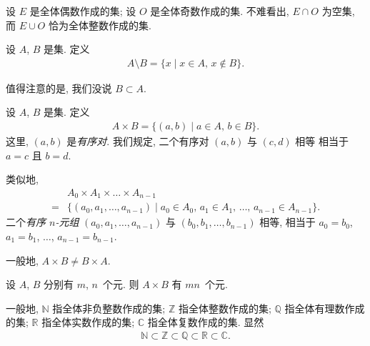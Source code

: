 \begin{example}
    设 $E$ 是全体偶数作成的集;
    设 $O$ 是全体奇数作成的集.
    不难看出, $E \cap O$ 为空集,
    而 $E \cup O$ 恰为全体整数作成的集.
\end{example}

\begin{definition}
    设 $A$, $B$ 是集. 定义
    \begin{align*}
        A \setminus B = \{ x \mid \text{$x \in A$, $x \notin B$} \}.
    \end{align*}
\end{definition}

\begin{remark}
    值得注意的是, 我们没说 $B \subset A$.
\end{remark}

\begin{definition}
    设 $A$, $B$ 是集. 定义
    \begin{align*}
        A \times B = \{ (a,b) \mid \text{$a \in A$, $b \in B$} \}.
    \end{align*}
    这里, $(a, b)$ 是\emph{有序对}.
    我们规定,
    二个有序对 $(a, b)$ 与 $(c, d)$ 相等%
    相当于 $a = c$ 且 $b = d$.

    类似地,
    \begin{align*}
             & A_0 \times A_1 \times \dots \times A_{n-1}                                                                 \\
        = {} & \{ (a_0, a_1, \dots, a_{n-1}) \mid \text{$a_0 \in A_0$, $a_1 \in A_1$, $\dots$, $a_{n-1} \in A_{n-1}$} \}.
    \end{align*}
    二个\emph{有序 $n$-元组}%
    $(a_0, a_1, \dots, a_{n-1})$ 与
    $(b_0, b_1, \dots, b_{n-1})$ 相等,
    相当于
    $a_0 = b_0$, $a_1 = b_1$, $\dots$,
    $a_{n-1} = b_{n-1}$.
\end{definition}

\begin{remark}
    一般地, $A \times B \neq B \times A$.
\end{remark}

\begin{remark}
    设 $A$, $B$ 分别有 $m$, $n$~个元.
    则 $A \times B$ 有 $mn$~个元.
\end{remark}

\begin{definition}
    一般地,
    $\mathbb{N}$ 指全体非负整数作成的集;
    $\mathbb{Z}$ 指全体整数作成的集;
    $\mathbb{Q}$ 指全体有理数作成的集;
    $\mathbb{R}$ 指全体实数作成的集;
    $\mathbb{C}$ 指全体复数作成的集. 显然
    \begin{align*}
        \mathbb{N} \subset \mathbb{Z} \subset \mathbb{Q} \subset \mathbb{R} \subset \mathbb{C}.
    \end{align*}
\end{definition}

